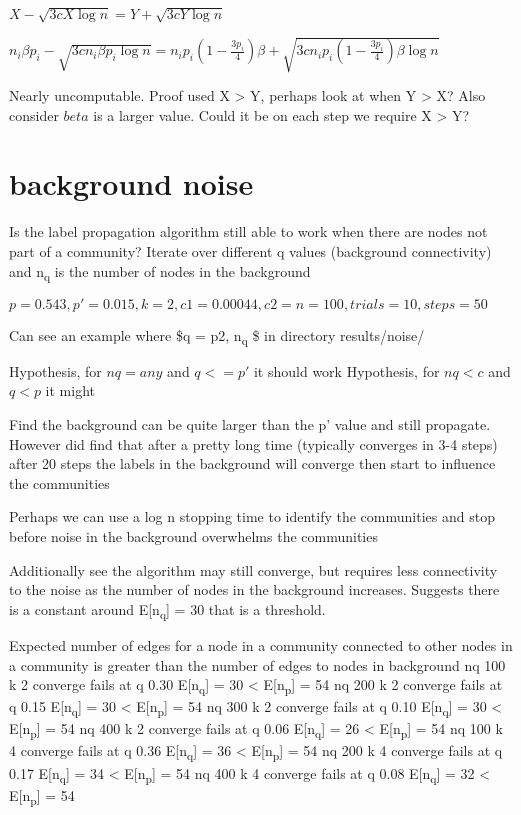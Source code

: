 \documentclass[11pt]{article}
\begin{document}
\(X - \sqrt{3 c X \log{n}} = Y + \sqrt{3 c Y \log{n}}\)

\(n_i \beta p_i - \sqrt{3 c n_i \beta p_i \log{n}} = n_i p_i (1 - \frac{3 p_i}{4}) \beta + \sqrt{3 c n_i p_i (1 - \frac{3 p_i}{4}) \beta \log{n}}\)

Nearly uncomputable. Proof used X > Y, perhaps look at when Y > X? Also consider \(beta\) is a larger value. 
Could it be on each step we require X > Y?

\section{background noise}
\label{sec:org4cdb531}

Is the label propagation algorithm still able to work when there are nodes not part of a community?
Iterate over different q values (background connectivity) and n\textsubscript{q} is the number of nodes in the background

\(p = 0.543, p' = 0.015, k = 2, c1 = 0.00044, c2 = n = 100, trials = 10, steps=50\)

Can see an example where \$q = p2, n\textsubscript{q} \$ in directory results/noise/

Hypothesis, for \(nq = any\) and \(q <= p'\) it should work
Hypothesis, for \(nq < c\) and \(q < p\) it might

Find the background can be quite larger than the p' value and still propagate. However did find that after a 
pretty long time (typically converges in 3-4 steps) after 20 steps the labels in the background will converge then
start to influence the communities

Perhaps we can use a log n stopping time to identify the communities and stop before noise in the background 
overwhelms the communities

Additionally see the algorithm may still converge, but requires less connectivity to the noise as the number of
nodes in the background increases. Suggests there is a constant around E[n\textsubscript{q}] = 30 that is a threshold.

Expected number of edges for a node in a community connected to other nodes in a community is greater
than the number of edges to nodes in background
nq 100 k 2 converge fails at q 0.30 E[n\textsubscript{q}] = 30 < E[n\textsubscript{p}] = 54
nq 200 k 2 converge fails at q 0.15 E[n\textsubscript{q}] = 30 < E[n\textsubscript{p}] = 54
nq 300 k 2 converge fails at q 0.10 E[n\textsubscript{q}] = 30 < E[n\textsubscript{p}] = 54
nq 400 k 2 converge fails at q 0.06 E[n\textsubscript{q}] = 26 < E[n\textsubscript{p}] = 54
nq 100 k 4 converge fails at q 0.36 E[n\textsubscript{q}] = 36 < E[n\textsubscript{p}] = 54
nq 200 k 4 converge fails at q 0.17 E[n\textsubscript{q}] = 34 < E[n\textsubscript{p}] = 54
nq 400 k 4 converge fails at q 0.08 E[n\textsubscript{q}] = 32 < E[n\textsubscript{p}] = 54
\end{document}
